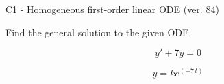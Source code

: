 \begin{exercise}
  \begin{exerciseTitle}C1 - Homogeneous first-order linear ODE (ver. 84)\end{exerciseTitle}
  \begin{exerciseStatement}
    
Find the general solution to the given ODE.

    
\[y'+7y=0\]

  \end{exerciseStatement}
  \begin{exerciseAnswer}
    
\[y= k e^{\left(-7 \, t\right)}\]

  \end{exerciseAnswer}
\end{exercise}